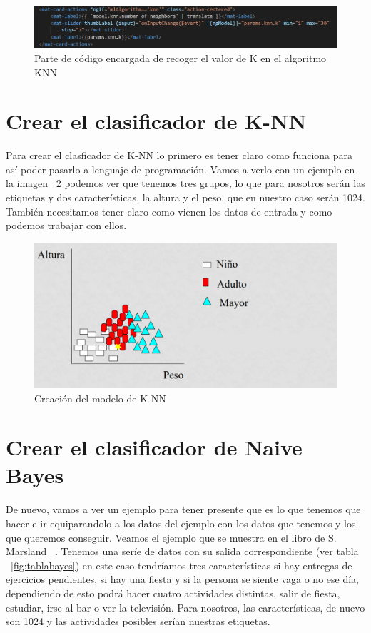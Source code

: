 \documentclass[a4paper, 12pt]{book}
\begin{document}
\begin{figure}
	\centering
	\includegraphics[width=12cm, keepaspectratio]{img/nvecinosknn}
	\caption{Parte de código encargada de recoger el valor de K en el algoritmo KNN}				
        \label{fig:nvecinosknn}
\end{figure}


\section{Crear el clasificador de K-NN} 
\label{sec:knn}

Para crear el clasficador de K-NN lo primero es tener claro como funciona para así poder pasarlo a lenguaje de programación. Vamos a verlo con un ejemplo en  la imagen ~\ref{fig:ejemploknn} podemos ver que tenemos tres grupos, lo que para nosotros serán las etiquetas y dos características, la altura y el peso, que en nuestro caso serán 1024. También necesitamos tener claro como vienen los datos de entrada y como podemos trabajar con ellos. 

\begin{figure}
	\centering
	\includegraphics[width=12cm, keepaspectratio]{img/ejemploknn}
	\caption{Creación del modelo de K-NN}				
	\label{fig:ejemploknn}
\end{figure}



\section{Crear el clasificador de Naive Bayes} 
\label{sec:naivebayes}

De nuevo, vamos a ver un ejemplo para tener presente que es lo que tenemos que hacer e ir equiparandolo a los datos del ejemplo con los datos que tenemos y los que queremos conseguir. Veamos el ejemplo que se muestra en el libro de S. Marsland ~\cite{machinelearning}. Tenemos una seríe de datos con su salida correspondiente (ver tabla ~\ref{fig:tablabayes}) en este caso tendríamos tres características si hay entregas de ejercicios pendientes, si hay una fiesta y si la persona se siente vaga o no ese día, dependiendo de esto podrá hacer cuatro actividades distintas, salir de fiesta, estudiar, irse al bar o ver la televisión. Para nosotros, las características, de nuevo son 1024 y las actividades posibles serían nuestras etiquetas. 
\end{document}
